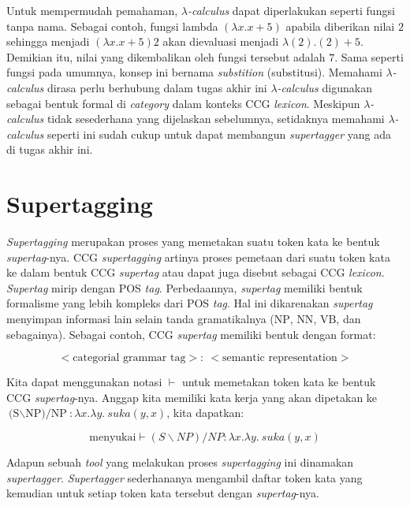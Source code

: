 Untuk mempermudah pemahaman, {$\lambda$}\textit{-calculus} dapat diperlakukan seperti fungsi tanpa
nama. Sebagai contoh, fungsi lambda $({\lambda}x. x + 5)$ apabila diberikan nilai $2$ sehingga
menjadi $({\lambda}x. x + 5) 2$ akan dievaluasi menjadi ${\lambda}(2). (2) + 5$.
Demikian itu, nilai yang dikembalikan oleh fungsi tersebut adalah $7$.
Sama seperti fungsi pada umumnya, konsep ini bernama \textit{substition} (substitusi).
Memahami {$\lambda$}\textit{-calculus} dirasa perlu berhubung dalam tugas akhir ini
{$\lambda$}\textit{-calculus} digunakan sebagai bentuk formal di \textit{category}
dalam konteks CCG \textit{lexicon}. Meskipun {$\lambda$}\textit{-calculus} tidak sesederhana
yang dijelaskan sebelumnya, setidaknya memahami {$\lambda$}\textit{-calculus} seperti ini
sudah cukup untuk dapat membangun \textit{supertagger} yang ada di tugas akhir ini.


\section{Supertagging}
\textit{Supertagging} merupakan proses yang memetakan suatu token kata ke bentuk
\textit{supertag}-nya. CCG \textit{supertagging} artinya proses pemetaan dari suatu token
kata ke dalam bentuk CCG \textit{supertag} atau dapat juga disebut sebagai CCG \textit{lexicon}.
\textit{Supertag} mirip dengan POS \textit{tag}.
Perbedaannya, \textit{supertag} memiliki bentuk formalisme yang lebih kompleks dari POS
\textit{tag}.
Hal ini dikarenakan \textit{supertag} menyimpan informasi lain selain tanda gramatikalnya
($\text{NP}$, $\text{NN}$, $\text{VB}$, dan sebagainya).
Sebagai contoh, CCG \textit{supertag} memiliki bentuk dengan format:

\begin{equation*}
<\text{categorial\ grammar\ tag}>:\ <\text{semantic\ representation}>
\end{equation*}

Kita dapat menggunakan notasi $\vdash$ untuk memetakan token kata ke bentuk CCG
\textit{supertag}-nya.
Anggap kita memiliki kata kerja  yang akan dipetakan ke
$\text{(S{$\backslash$}NP)/NP}: \lambda x.\lambda y.\ suka(y, x)$, kita dapatkan:

\begin{equation*}
  \text{menyukai} \vdash (S{\backslash}NP)/NP: \lambda x.\lambda y.\ suka(y, x)
\end{equation*}

Adapun sebuah \textit{tool} yang melakukan proses \textit{supertagging} ini dinamakan
\textit{supertagger}.
\textit{Supertagger} sederhananya mengambil daftar token kata yang kemudian untuk setiap
token kata tersebut  dengan \textit{supertag}-nya.



